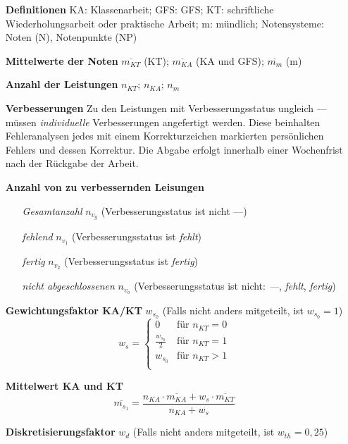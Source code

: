 \documentclass{article}
\begin{document}
\begin{enumerate}[label=\textbf{\textbullet}, align=left, leftmargin=*]
	\item[\textbf{Definitionen}] KA: Klassenarbeit; GFS: GFS; KT: schriftliche Wiederholungsarbeit oder praktische Arbeit; m: mündlich; Notensysteme: Noten (N), Notenpunkte (NP)
	\item[\textbf{Mittelwerte der Noten}] $\overline{m_{KT}}$ (KT); $\overline{m_{KA}}$ (KA und GFS); $\overline{m_{m}}$ (m)
	\item[\textbf{Anzahl der Leistungen}] $n_{KT}$; $n_{KA}$; $n_{m}$
	\item[\textbf{Verbesserungen}] Zu den Leistungen mit Verbesserungsstatus ungleich \glqq ---\grqq{} müssen \textit{individuelle} Verbesserungen angefertigt werden. Diese beinhalten Fehleranalysen jedes mit einem Korrekturzeichen markierten persönlichen Fehlers und dessen Korrektur. Die Abgabe erfolgt innerhalb einer Wochenfrist nach der Rückgabe der Arbeit.
	\item[\textbf{Anzahl von zu verbessernden Leisungen}] \mbox{} \
	\begin{enumerate}[label=\textbf{\textbullet}, align=left, leftmargin=*]
		\item[\textit{Gesamtanzahl}] $n_{v_g}$ (Verbesserungsstatus ist nicht \glqq ---\grqq{})
		\item[\textit{fehlend}] $n_{v_1}$ (Verbesserungsstatus ist \glqq \textit{fehlt}\grqq{})
		\item[\textit{fertig}] $n_{v_2}$ (Verbesserungsstatus ist \glqq \textit{fertig}\grqq{})
		\item[\textit{nicht abgeschlossenen}] $n_{v_o}$ (Verbesserungsstatus ist nicht: \glqq\textit{---}\grqq{}, \glqq\textit{fehlt}\grqq{}, \glqq\textit{fertig}\grqq{})
	\end{enumerate}
	\item[\textbf{Gewichtungsfaktor KA/KT}] $w_{s_0}$ (Falls nicht anders mitgeteilt, ist $w_{s_0}=1$)
	\[
	w_s =
	\begin{cases}
		0 & \text{für }  n_{KT} = 0 \\
		\frac{w_{s_0}}{2} & \text{für }    n_{KT} = 1 \\
		w_{s_0} & \text{für }    n_{KT} > 1 \\
	\end{cases}
	\]	
	\item[\textbf{Mittelwert KA und KT}] 
	\[
	\overline{m_{s_1}} = \frac{ n_{KA} \cdot \overline{m_{KA}} + w_s \cdot \overline{m_{KT}} }{n_{KA} + w_s}
	\]
	\item[\textbf{Diskretisierungsfaktor}] $w_{d}$ (Falls nicht anders mitgeteilt, ist $w_{th}=0{,}25$) \cite{wikimodulo,wikibetrag}

\end{enumerate}
\end{document}
